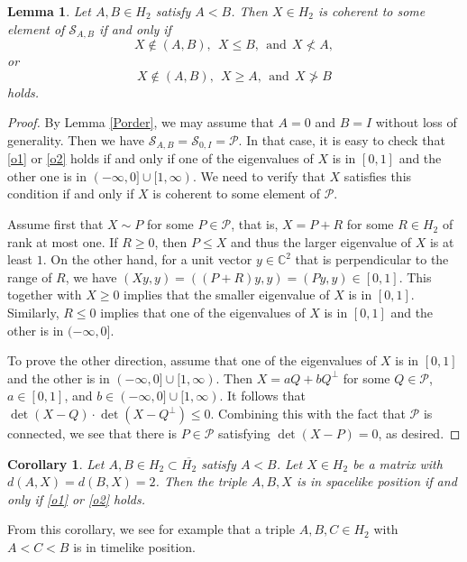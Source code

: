 \documentclass[10pt]{amsart}
\newtheorem{lemma}[theorem]{Lemma}
\newtheorem{corollary}[theorem]{Corollary}
\theoremstyle{definition}
\theoremstyle{remark}
\numberwithin{subsection}{section}
\numberwithin{equation}{section}
\newcommand\cP{{\mathcal{P}}}
\newcommand\oH{{\overline{H_2}}}
\begin{document}
\begin{lemma}\label{c(s)}
Let $A, B\in H_2$ satisfy $A<B$. 
Then $X\in H_2$ is coherent to some element of $\mathcal{S}_{A, B}$ if and only if 
\begin{equation}\label{o1}
X\notin (A, B),\ \  X\leq B,\ \ \text{and} \ \ X\not< A,
\end{equation}
or
\begin{equation}\label{o2}
X\notin (A, B),\ \ X\geq A,\ \ \text{and}\ \ X\not> B 
\end{equation}
holds.
\end{lemma}
\begin{proof}
By Lemma \ref{Porder}, we may assume that $A=0$ and $B=I$ without loss of generality.
Then we have $\mathcal{S}_{A, B}=\mathcal{S}_{0, I}=\mathcal{P}$. 
In that case, it is easy to check that \eqref{o1} or \eqref{o2} holds if and only if one of the eigenvalues of $X$ is in $[0,1]$ and the other one is in $(-\infty, 0]\cup [1, \infty)$.
We need to verify that $X$ satisfies this condition if and only if $X$ is coherent to some element of $\mathcal{P}$.

Assume first that $X \sim P$ for some $P \in \mathcal{P}$, that is, $X = P +R$ for some $R \in H_2$ of rank at most one. 
If $R\geq 0$, then $P\leq X$ and thus the larger eigenvalue of $X$ is at least $1$. 
On the other hand, for a unit vector $y\in \mathbb{C}^2$ that is perpendicular to the range of $R$, we have $(Xy,y)=( (P+R) y,y) = (Py,y) \in [0,1]$.
This together with $X\geq 0$ implies that the smaller eigenvalue of $X$ is in $[0,1]$. 
Similarly, $R\leq 0$ implies that one of the eigenvalues of $X$ is in $[0,1]$ and the other is in $(-\infty, 0]$. 

To prove the other direction, assume that one of the eigenvalues of $X$ is in $[0,1]$ and the other is in $(-\infty, 0]\cup [1, \infty)$. 
Then $X=aQ+bQ^\perp$ for some $Q\in \cP$, $a\in [0,1]$, and $b\in (-\infty, 0]\cup [1, \infty)$.
It follows that $\det(X-Q)\cdot \det(X-Q^\perp)\leq 0$. 
Combining this with the fact that $\cP$ is connected, we see that there is $P\in \cP$ satisfying $\det(X-P)=0$, as desired.
\end{proof}





\begin{corollary}\label{matrixtriple}
Let $A, B\in H_2\subset \oH$ satisfy $A<B$. 
Let $X\in H_2$ be a matrix with $d(A, X)=d(B,X)=2$. 
Then the triple $A, B, X$ is in spacelike position if and only if \eqref{o1} or \eqref{o2} holds.
\end{corollary}
From this corollary, we see for example that a triple $A,B, C\in H_2$ with $A<C<B$ is in timelike position.
\end{document}
